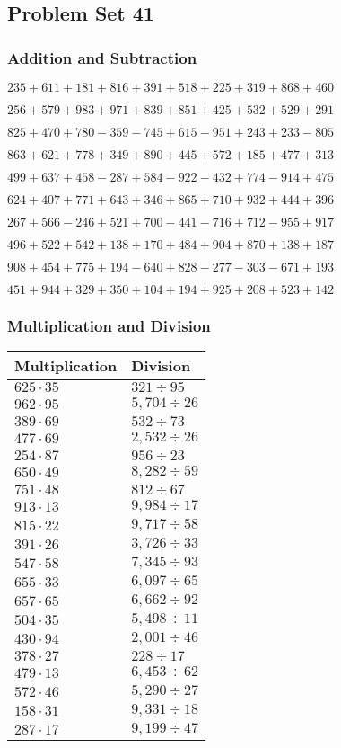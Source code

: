 \hypertarget{problem-set-41-2}{%
\subsection{Problem Set 41}\label{problem-set-41-2}}

\hypertarget{addition-and-subtraction-141}{%
\subsubsection{Addition and
Subtraction}\label{addition-and-subtraction-141}}

\(235 + 611 + 181 + 816 + 391 + 518 + 225 + 319 + 868 + 460\)

\(256 + 579 + 983 + 971 + 839 + 851 + 425 + 532 + 529 + 291\)

\(825 + 470 + 780 - 359 - 745 + 615 - 951 + 243 + 233 - 805\)

\(863 + 621 + 778 + 349 + 890 + 445 + 572 + 185 + 477 + 313\)

\(499 + 637 + 458 - 287 + 584 - 922 - 432 + 774 - 914 + 475\)

\(624 + 407 + 771 + 643 + 346 + 865 + 710 + 932 + 444 + 396\)

\(267 + 566 - 246 + 521 + 700 - 441 - 716 + 712 - 955 + 917\)

\(496 + 522 + 542 + 138 + 170 + 484 + 904 + 870 + 138 + 187\)

\(908 + 454 + 775 + 194 - 640 + 828 - 277 - 303 - 671 + 193\)

\(451 + 944 + 329 + 350 + 104 + 194 + 925 + 208 + 523 + 142\)

\hypertarget{multiplication-and-division-141}{%
\subsubsection{Multiplication and
Division}\label{multiplication-and-division-141}}

\begin{longtable}[]{@{}ll@{}}
\toprule
Multiplication & Division\tabularnewline
\midrule
\endhead
\(625 \cdot 35\) & \(321÷95\)\tabularnewline
\(962 \cdot 95\) & \(5,704÷26\)\tabularnewline
\(389 \cdot 69\) & \(532÷73\)\tabularnewline
\(477 \cdot 69\) & \(2,532÷26\)\tabularnewline
\(254 \cdot 87\) & \(956÷23\)\tabularnewline
\(650 \cdot 49\) & \(8,282÷59\)\tabularnewline
\(751 \cdot 48\) & \(812÷67\)\tabularnewline
\(913 \cdot 13\) & \(9,984÷17\)\tabularnewline
\(815 \cdot 22\) & \(9,717÷58\)\tabularnewline
\(391 \cdot 26\) & \(3,726÷33\)\tabularnewline
\(547 \cdot 58\) & \(7,345÷93\)\tabularnewline
\(655 \cdot 33\) & \(6,097÷65\)\tabularnewline
\(657 \cdot 65\) & \(6,662÷92\)\tabularnewline
\(504 \cdot 35\) & \(5,498÷11\)\tabularnewline
\(430 \cdot 94\) & \(2,001÷46\)\tabularnewline
\(378 \cdot 27\) & \(228÷17\)\tabularnewline
\(479 \cdot 13\) & \(6,453÷62\)\tabularnewline
\(572 \cdot 46\) & \(5,290÷27\)\tabularnewline
\(158 \cdot 31\) & \(9,331÷18\)\tabularnewline
\(287 \cdot 17\) & \(9,199÷47\)\tabularnewline
\bottomrule
\end{longtable}

